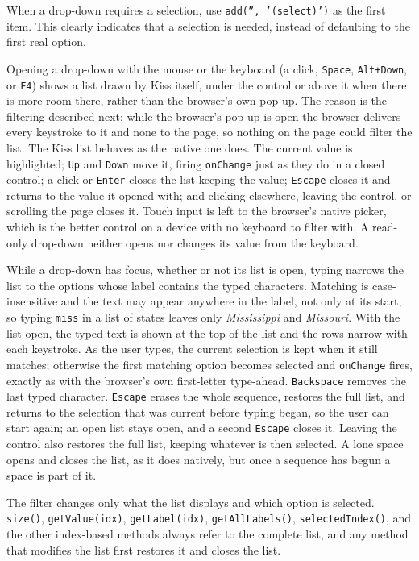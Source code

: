 \begin{tipbox}
When a drop-down requires a selection, use \texttt{add('', '(select)')} as the first item.  This clearly indicates that a selection is needed, instead of defaulting to the first real option.
\end{tipbox}

Opening a drop-down with the mouse or the keyboard (a click, \texttt{Space}, \texttt{Alt+Down}, or \texttt{F4}) shows a list drawn by Kiss itself, under the control or above it when there is more room there, rather than the browser's own pop-up.  The reason is the filtering described next: while the browser's pop-up is open the browser delivers every keystroke to it and none to the page, so nothing on the page could filter the list.  The Kiss list behaves as the native one does.  The current value is highlighted; \texttt{Up} and \texttt{Down} move it, firing \texttt{onChange} just as they do in a closed control; a click or \texttt{Enter} closes the list keeping the value; \texttt{Escape} closes it and returns to the value it opened with; and clicking elsewhere, leaving the control, or scrolling the page closes it.  Touch input is left to the browser's native picker, which is the better control on a device with no keyboard to filter with.  A read-only drop-down neither opens nor changes its value from the keyboard.

While a drop-down has focus, whether or not its list is open, typing narrows the list to the options whose label contains the typed characters.  Matching is case-insensitive and the text may appear anywhere in the label, not only at its start, so typing \texttt{miss} in a list of states leaves only \emph{Mississippi} and \emph{Missouri}.  With the list open, the typed text is shown at the top of the list and the rows narrow with each keystroke.  As the user types, the current selection is kept when it still matches; otherwise the first matching option becomes selected and \texttt{onChange} fires, exactly as with the browser's own first-letter type-ahead.  \texttt{Backspace} removes the last typed character.  \texttt{Escape} erases the whole sequence, restores the full list, and returns to the selection that was current before typing began, so the user can start again; an open list stays open, and a second \texttt{Escape} closes it.  Leaving the control also restores the full list, keeping whatever is then selected.  A lone space opens and closes the list, as it does natively, but once a sequence has begun a space is part of it.

The filter changes only what the list displays and which option is selected.  \texttt{size()}, \texttt{getValue(idx)}, \texttt{getLabel(idx)}, \texttt{getAllLabels()}, \texttt{selectedIndex()}, and the other index-based methods always refer to the complete list, and any method that modifies the list first restores it and closes the list.


